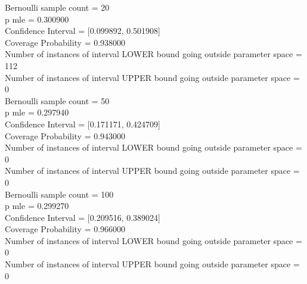 \documentclass{article}
\begin{document}
Bernoulli sample count = 20\\
p mle = 0.300900\\
Confidence Interval = [0.099892, 0.501908]\\
Coverage Probability = 0.938000\\
Number of instances of interval LOWER bound going outside parameter space = 112\\
Number of instances of interval UPPER bound going outside parameter space = 0\\

Bernoulli sample count = 50\\
p mle = 0.297940\\
Confidence Interval = [0.171171, 0.424709]\\
Coverage Probability = 0.943000\\
Number of instances of interval LOWER bound going outside parameter space = 0\\
Number of instances of interval UPPER bound going outside parameter space = 0\\

Bernoulli sample count = 100\\
p mle = 0.299270\\
Confidence Interval = [0.209516, 0.389024]\\
Coverage Probability = 0.966000\\
Number of instances of interval LOWER bound going outside parameter space = 0\\
Number of instances of interval UPPER bound going outside parameter space = 0\\
\end{document}
